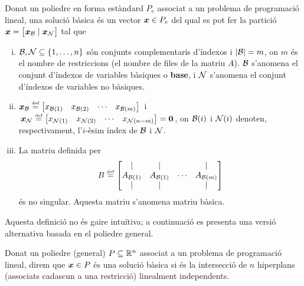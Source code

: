 \begin{defi}\label{defi:SB}
	Donat un poliedre en forma estàndard $P_e$ associat a un problema de programació lineal, una solució bàsica és un vector $\boldsymbol{x}\in P_e$ del qual es pot fer la partició $\boldsymbol{x} = \left[\boldsymbol{x}_{\mathcal{B}}\mid\boldsymbol{x}_{\mathcal{N}}\right]$ tal que
	\begin{enumerate}[i)]
		\item $\mathcal{B},\mathcal{N}\subseteq\{1,\ldots,n \}$ són conjunts complementaris d'índexos i $|\mathcal{B}| = m$, on $m$ és el nombre de restriccions (el nombre de files de la matriu $A$). $\mathcal{B}$ s'anomena el conjunt d'índexos de variables bàsiques o \textbf{base}, i $\mathcal{N}$ s'anomena el conjunt d'índexos de variables no bàsiques.
		\item $\boldsymbol{x}_{\mathcal{B}} \stackrel{\text{\tiny def}}{=} 
		\begin{bmatrix}x_{\mathcal{B}(1)} & x_{\mathcal{B}(2)} & \cdots & x_{\mathcal{B}(m)}\end{bmatrix}\,$
		i
		$\,\boldsymbol{x}_{\mathcal{N}} \stackrel{\text{\tiny def}}{=} 
		\begin{bmatrix}x_{\mathcal{N}(1)} & x_{\mathcal{N}(2)} & \cdots & x_{\mathcal{N}(n-m)}\end{bmatrix} = \boldsymbol{0}\,$, on $\mathcal{B}(i)$ i $\mathcal{N}(i)$ denoten, respectivament, l'$i$-èsim índex de $\mathcal{B}$ i $\mathcal{N}$.
		\item La matriu definida per
		\[
			B \stackrel{\text{\tiny def}}{=}
			\begin{bmatrix}
			\arrowvert& 	\arrowvert& 	  & 	\arrowvert\\
			A_{\mathcal{B}(1)}&		A_{\mathcal{B}(1)}&	\cdots&		A_{\mathcal{B}(m)}\\
			\arrowvert& 	\arrowvert& 	  & 	\arrowvert\\
			\end{bmatrix}
		\]
		és no singular. Aquesta matriu s'anomena matriu bàsica.
	\end{enumerate}
\end{defi}

Aquesta definició no és gaire intuïtiva; a continuació es presenta una versió alternativa basada en el poliedre general.

\begin{defi}\label{defi:SB-alt}
	Donat un poliedre (general) $P\subseteq\mathbb{R}^n$ associat a un problema de programació lineal, direm que $\boldsymbol{x}\in P$ és una solució bàsica si és la intersecció de $n$ hiperplans (associats cadascun a una restricció) linealment independents.
\end{defi}

